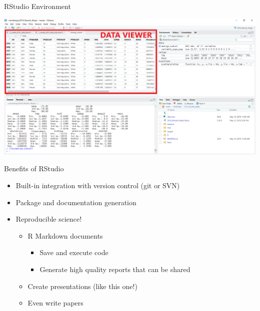\documentclass[
  ignorenonframetext,
]{beamer}
\providecommand{\tightlist}{%
  \setlength{\itemsep}{0pt}\setlength{\parskip}{0pt}}
\begin{document}
\begin{frame}{RStudio Environment}
\protect\hypertarget{rstudio-environment-4}{}

\includegraphics{../external/images/rstudio_terminal_5_DATA.png}

\end{frame}

\begin{frame}{Benefits of RStudio}
\protect\hypertarget{benefits-of-rstudio}{}

\begin{itemize}
\tightlist
\item
  Built-in integration with version control (git or SVN)
\item
  Package and documentation generation
\item
  Reproducible science!

  \begin{itemize}
  \tightlist
  \item
    R Markdown documents

    \begin{itemize}
    \tightlist
    \item
      Save and execute code
    \item
      Generate high quality reports that can be shared
    \end{itemize}
  \item
    Create presentations (like this one!)
  \item
    Even write papers
  \end{itemize}
\end{itemize}

\end{frame}
\end{document}

